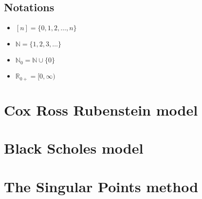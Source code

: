 \documentclass[12pt,a4paper]{amsbook}
\begin{document}



\tableofcontents


\section*{Notations}
\begin{itemize}
\item $ [n] = \{0, 1, 2, \dots, n\} $
\item $ \mathbb{N} = \{ 1, 2, 3, \dots \} $
\item $ \mathbb{N}_0 = \mathbb{N} \cup \{ 0 \} $
\item $ \mathbb{R}_{0+} = [0, \infty) $
\end{itemize}


\chapter{Cox Ross Rubenstein model}
\label{cha:crr}



\chapter{Black Scholes model}
\label{cha:bs}



\chapter{The Singular Points method}
\label{cha:sp}



% 
\printbibliography
\end{document}
